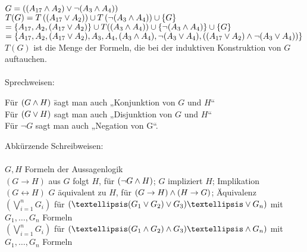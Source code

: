 \beispiel{}
$G= \left( (A_{17} \wedge A_2) \vee \neg (A_3 \wedge A_4) \right)$\\
$T(G) = T \left( (A_{17} \vee A_2) \right) \cup T \left(\neg ( A_3 \wedge A_4) \right) \cup \{G\}$\\
$= \{ A_{17}, A_2, (A_{17} \vee A_2) \} \cup T((A_3 \wedge A_4)) \cup \{ \neg (A_3 \wedge A_4) \} \cup \{G\}$\\
$= \{A_{17}, A_2, (A_{17} \vee A_2), A_3, A_4, (A_3 \wedge A_4), \neg (A_3 \vee A_4), \left( (A_{17} \vee A_2) \wedge \neg (A_3 \vee A_4) \right) \}$\\
    
\bemerkung{}
$T(G)$ ist die Menge der Formeln, die bei der induktiven Konstruktion von $G$ auftauchen.\\
\noindent\\
Sprechweisen:
\begin{tabbing}
Für $(G \wedge H)$ \= sagt man auch „Konjunktion von $G$ und $H$“\\
Für $(G \vee H)$ \> sagt man auch „Disjunktion von $G$ und $H$“\\
Für $\neg G$ \> sagt man auch „Negation von G“.\\
\end{tabbing}

\noindent
Abkürzende Schreibweisen:\\
\noindent\\
$G, H$ Formeln der Aussagenlogik\\
$(G \rightarrow H)$ aus $G$ folgt $H$, für $(\neg G \wedge H)$; $G$ impliziert $H$; Implikation\\
$(G \leftrightarrow H)$ $G$ äquivalent zu $H$, für $(G \rightarrow H) \wedge (H \rightarrow G)$; Äquivalenz\\
$( \bigvee_{i=1}^{n} G_i )$ für $\left( … (G_1 \OR G_2) \OR G_3 ) … \OR G_n \right)$ \hspace{1cm}mit $G_1, …, G_n$ Formeln\\
$( \bigvee_{i=1}^n G_i )$ für $\left(… ( G_1 \AND G_2) \AND G_3) … \AND G_n \right)$ \hspace{1cm}mit $G_1, …, G_n$ Formeln\\

